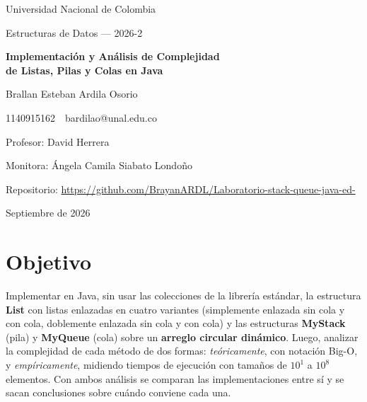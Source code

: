 \documentclass[11pt,a4paper]{article}
\makeatletter
\newcommand{\estudiante}{Brallan Esteban Ardila Osorio}
\newcommand{\codigo}{1140915162}
\newcommand{\correo}{bardilao@unal.edu.co}
\newcommand{\repositorio}{https://github.com/BrayanARDL/Laboratorio-stack-queue-java-ed-}
\makeatother
\begin{document}
\begin{titlepage}
\centering
\vspace*{1.5cm}
{\large Universidad Nacional de Colombia\par}
{\large Estructuras de Datos --- 2026-2\par}
\vspace{2.8cm}
{\LARGE\bfseries Implementación y Análisis de Complejidad\\[4pt] de Listas, Pilas y Colas en Java\par}
\vspace{0.8cm}
\vspace{3cm}
{\large \estudiante\par}
{\normalsize \codigo\ \textperiodcentered\ \correo\par}
\vspace{1.6cm}
{\normalsize Profesor: David Herrera\par}
{\normalsize Monitora: Ángela Camila Siabato Londoño\par}
\vfill
{\normalsize Repositorio: \url{\repositorio}\par}
\vspace{0.4cm}
{\normalsize Septiembre de 2026\par}
\end{titlepage}

\tableofcontents
\newpage

\section{Objetivo}
Implementar en Java, sin usar las colecciones de la librería estándar, la estructura \textbf{List} con
listas enlazadas en cuatro variantes (simplemente enlazada sin cola y con cola, doblemente enlazada sin
cola y con cola) y las estructuras \textbf{MyStack} (pila) y \textbf{MyQueue} (cola) sobre un
\textbf{arreglo circular dinámico}. Luego, analizar la complejidad de cada método de dos formas:
\emph{teóricamente}, con notación Big-O, y \emph{empíricamente}, midiendo tiempos de ejecución con
tamaños de $10^1$ a $10^8$ elementos. Con ambos análisis se comparan las implementaciones entre sí y
se sacan conclusiones sobre cuándo conviene cada una.
\end{document}
